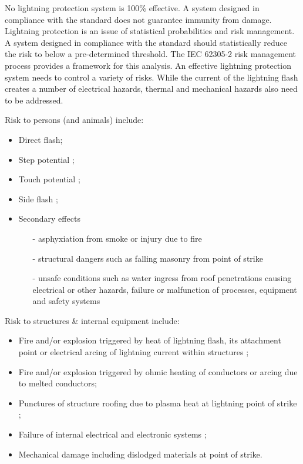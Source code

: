No lightning protection system is 100\% effective. A system designed in compliance with the standard does not guarantee immunity from damage. Lightning protection is an issue of statistical probabilities and risk management. A system designed in compliance with the standard should statistically reduce the risk to below a pre-determined threshold. The IEC 62305-2 risk management process provides a framework for this analysis. An effective lightning protection system needs to control a variety of risks. While the current of the lightning flash creates a number of electrical hazards, thermal and mechanical hazards also need to be addressed. 

Risk to persons (and animals) include: 

\begin{itemize}
\item Direct flash;
\item  Step potential ;
\item Touch potential ;
\item  Side flash ;
\item Secondary effects

\begin{itemize}
	
	 \item[-]  asphyxiation from smoke or injury due to fire 
	\item [-] structural dangers such as falling masonry from  point of strike 
	\item [-] unsafe conditions such as water ingress from roof  penetrations causing electrical or other hazards,  failure or malfunction of processes, equipment and  safety systems

\end{itemize}
\end{itemize}




Risk to structures \& internal equipment include: 

\begin{itemize}
\item Fire and/or explosion triggered by heat of lightning flash,  its attachment point or electrical arcing of lightning  current within structures ;
\item  Fire and/or explosion triggered by ohmic heating of  conductors or arcing due to melted conductors;
\item Punctures of structure roofing due to plasma heat  at lightning point of strike ;
\item Failure of internal electrical and electronic systems ;
\item Mechanical damage including dislodged materials at  point of strike.
\end{itemize}



